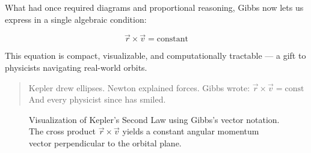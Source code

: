 What had once required diagrams and proportional reasoning,  
Gibbs now lets us express in a single algebraic condition:

\[
\vec{r} \times \vec{v} = \text{constant}
\]

This equation is compact, visualizable, and computationally tractable — a gift to physicists navigating real-world orbits.

\bigskip

\begin{quote}
Kepler drew ellipses.  
Newton explained forces.  
Gibbs wrote: \quad \( \vec{r} \times \vec{v} = \text{const} \)  
And every physicist since has smiled.
\end{quote}

\begin{figure}[H]
    \centering
    \caption{Visualization of Kepler’s Second Law using Gibbs’s vector notation. The cross product $\vec{r} \times \vec{v}$ yields a constant angular momentum vector perpendicular to the orbital plane.}
    \end{figure}
    
